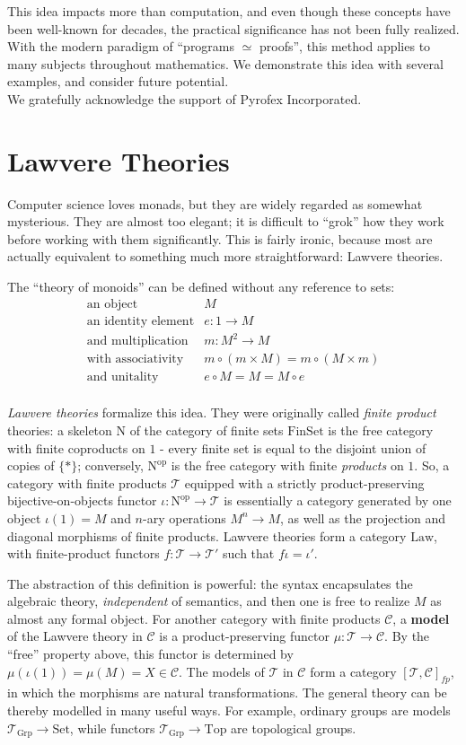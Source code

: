 \documentclass[a4paper,UKenglish]{article}
\theoremstyle{definition}
\newcommand{\Set}{\mathrm{Set}}
\newcommand{\Grp}{\mathrm{Grp}}
\newcommand{\Law}{\mathrm{Law}}
\newcommand{\Top}{\mathrm{Top}}
\newcommand{\FinSet}{\mathrm{FinSet}}
\newcommand{\op}{\mathrm{op}}
\newcommand{\NN}{\mathrm{N}}
\newcommand{\C}{\mathscr{C}}
\newcommand{\T}{\mathscr{T}}
\begin{document}
This idea impacts more than computation, and even though these concepts have been well-known for decades, the practical significance has not been fully realized. With the modern paradigm of ``programs $\simeq$ proofs'', this method applies to many subjects throughout mathematics. We demonstrate this idea with several examples, and consider future potential.\\

We gratefully acknowledge the support of Pyrofex Incorporated.

\section{Lawvere Theories}
Computer science loves monads, but they are widely regarded as somewhat mysterious. They are almost too elegant; it is difficult to ``grok'' how they work before working with them significantly. This is fairly ironic, because most are actually equivalent to something much more straightforward: Lawvere theories.

The ``theory of monoids'' can be defined without any reference to sets:
\[\begin{array}{rl}
\text{an object} & M\\
\text{an identity element} & e:1 \to M\\
\text{and multiplication} & m: M^2 \to M\\
\text{with associativity} & m \circ (m \times M) = m \circ (M \times m)\\
\text{and unitality} & e \circ M = M = M \circ e\\
\end{array}\]

\textit{Lawvere theories} formalize this idea. They were originally called \textit{finite product} theories: a skeleton $\NN$ of the category of finite sets $\FinSet$ is the free category with finite coproducts on $1$ - every finite set is equal to the disjoint union of copies of $\{*\}$; conversely, $\NN^\op$ is the free category with finite \textit{products} on $1$. So, a category with finite products $\T$ equipped with a strictly product-preserving bijective-on-objects functor $\iota:\NN^\op \to \T$ is essentially a category generated by one object $\iota(1) = M$ and $n$-ary operations $M^n \to M$, as well as the projection and diagonal morphisms of finite products. Lawvere theories form a category $\Law$, with finite-product functors $f: \T\to \T'$ such that $f\iota = \iota'$.

The abstraction of this definition is powerful: the syntax encapsulates the algebraic theory, \textit{independent} of semantics, and then one is free to realize $M$ as almost any formal object. For another category with finite products $\C$, a \textbf{model} of the Lawvere theory in $\C$ is a product-preserving functor $\mu: \T \to \C$. By the ``free'' property above, this functor is determined by $\mu(\iota(1)) = \mu(M) = X \in \C$. The models of $\T$ in $\C$ form a category $[\T,\C]_{fp}$, in which the morphisms are natural transformations. The general theory can be thereby modelled in many useful ways. For example, ordinary groups are models $\T_\Grp \to \Set$, while functors $\T_\Grp \to \Top$ are topological groups.
\end{document}
